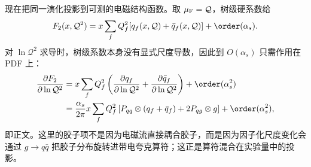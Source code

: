 \begin{derivation}[结构函数的标度破坏]
现在把同一演化投影到可测的电磁结构函数。取 $\mu_{\rm F}=\mathcal Q$，树级硬系数给
\begin{equation*}
 F_2(x,\mathcal Q^2)
 =x\sum_f Q_f^2[q_f(x,\mathcal Q)+\bar q_f(x,\mathcal Q)]
 +\order(\alpha_s).
\end{equation*}
对 $\ln\mathcal Q^2$ 求导时，树级系数本身没有显式尺度导数，因此到 $O(\alpha_s)$ 只需作用在 PDF 上：
\begin{align*}
 \frac{\partial F_2}{\partial\ln\mathcal Q^2}
 &=x\sum_fQ_f^2
 \left(
 \frac{\partial q_f}{\partial\ln\mathcal Q^2}
 +\frac{\partial\bar q_f}{\partial\ln\mathcal Q^2}
 \right)+\order(\alpha_s^2)\\
 &=\frac{\alpha_s}{2\pi}x\sum_fQ_f^2
 \left[
 P_{qq}\otimes(q_f+\bar q_f)
 +2P_{qg}\otimes g
 \right]+\order(\alpha_s^2),
\end{align*}
即正文。这里的胶子项不是因为电磁流直接耦合胶子，而是因为因子化尺度变化会通过 $g\to q\bar q$ 把胶子分布旋转进带电夸克算符；这正是算符混合在实验量中的投影。
\end{derivation}

